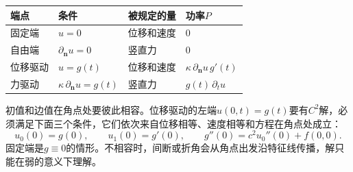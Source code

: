 \begin{BookInlineTable}
  \centering
  \caption{端点条件和端点功率}
  \label{tab:wave-boundary}
  \begin{tabular}{llll}
    \toprule
    端点 & 条件 & 被规定的量 & 功率$P$\\
    \midrule
    固定端 & $u=0$ & 位移和速度 & $0$\\
    自由端 & $\partial_{\bm{n}}u=0$ & 竖直力 & $0$\\
    位移驱动 & $u=g(t)$ & 位移和速度 & $\kappa\,\partial_{\bm{n}}u\,g'(t)$\\
    力驱动 & $\kappa\,\partial_{\bm{n}}u=g(t)$ & 竖直力 & $g(t)\,\partial_tu$\\
    \bottomrule
  \end{tabular}
\end{BookInlineTable}

初值和边值在角点处要彼此相容。位移驱动的左端$u(0,t)=g(t)$要有$C^{2}$解，必须满足下面三个条件，它们依次来自位移相等、速度相等和方程在角点处成立：
\[
 u_0(0)=g(0),\qquad u_1(0)=g'(0),\qquad g''(0)=c^{2}u_0''(0)+f(0,0).
\]
固定端是$g\equiv0$的情形。不相容时，间断或折角会从角点出发沿特征线传播，解只能在弱的意义下理解。

